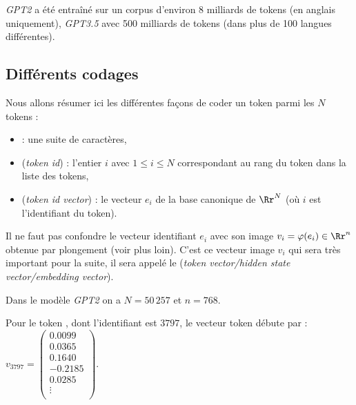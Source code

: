 \documentclass[11pt,class=report,crop=false]{standalone}
\begin{document}
	
\emph{GPT2} a été entraîné sur un corpus d'environ 8 milliards de tokens (en anglais uniquement), \emph{GPT3.5} avec 500  milliards de tokens (dans plus de 100 langues différentes).


\subsection{Différents codages}

Nous allons résumer ici les différentes façons de coder un token parmi les $N$ tokens :
\begin{itemize}
	\item {} : une suite de caractères,
	\item {} (\emph{token id}) : l'entier $i$ avec $1 \le i \le N$ correspondant au rang du token dans la liste des tokens,
	\item {} (\emph{token id vector}) : le vecteur $e_i$ de la base canonique de $\Rr^N$ (où $i$ est l'identifiant du token).
\end{itemize}

Il ne faut pas confondre le vecteur identifiant $e_i$ avec son image $v_i  = \varphi(e_i) \in \Rr^n$ obtenue par plongement (voir plus loin). C'est ce vecteur image $v_i$ qui sera très important pour la suite, il sera appelé le  (\emph{token vector/hidden state vector/embedding vector}).


\begin{exemple}
	
Dans le modèle \emph{GPT2} on a $N = 50\,257$ et $n=768$.


Pour le token , dont l'identifiant est $3797$, le vecteur token débute par :
$v_{3797} = 
\left(\begin{smallmatrix}
0.0099 \\
0.0365 \\  
0.1640 \\
-0.2185 \\   
0.0285 \\
\vdots \\
\end{smallmatrix}\right).$
	
\end{exemple}

\end{document}
